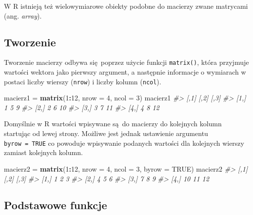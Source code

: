 \documentclass[paper=6in:9in,pagesize=pdftex,headinclude=on,footinclude=on,10pt]{scrbook}
\newenvironment{Shaded}{\begin{snugshade}}{\end{snugshade}}
\newcommand{\CommentTok}[1]{\textcolor[rgb]{0.56,0.35,0.01}{\textit{#1}}}
\newcommand{\DataTypeTok}[1]{\textcolor[rgb]{0.13,0.29,0.53}{#1}}
\newcommand{\DecValTok}[1]{\textcolor[rgb]{0.00,0.00,0.81}{#1}}
\newcommand{\KeywordTok}[1]{\textcolor[rgb]{0.13,0.29,0.53}{\textbf{#1}}}
\newcommand{\NormalTok}[1]{#1}
\newcommand{\OperatorTok}[1]{\textcolor[rgb]{0.81,0.36,0.00}{\textbf{#1}}}
\newcommand{\OtherTok}[1]{\textcolor[rgb]{0.56,0.35,0.01}{#1}}
\newcommand{\StringTok}[1]{\textcolor[rgb]{0.31,0.60,0.02}{#1}}
\let\BeginKnitrBlock\begin \let\EndKnitrBlock\end
\begin{document}
\BeginKnitrBlock{rmdinfo}
W R istnieją też wielowymiarowe obiekty podobne do macierzy zwane matrycami (ang. \emph{array}).
\EndKnitrBlock{rmdinfo}

\hypertarget{tworzenie}{%
\subsection{Tworzenie}\label{tworzenie}}

Tworzenie macierzy odbywa się~poprzez użycie funkcji \texttt{matrix()}, która przyjmuje wartości wektora jako pierwszy argument, a następnie informacje o wymiarach w postaci liczby wierszy (\texttt{nrow}) i liczby kolumn (\texttt{ncol}).

\begin{Shaded}
\begin{Highlighting}[]
\NormalTok{macierz1 =}\StringTok{ }\KeywordTok{matrix}\NormalTok{(}\DecValTok{1}\OperatorTok{:}\DecValTok{12}\NormalTok{, }\DataTypeTok{nrow =} \DecValTok{4}\NormalTok{, }\DataTypeTok{ncol =} \DecValTok{3}\NormalTok{)}
\NormalTok{macierz1}
\CommentTok{#>      [,1] [,2] [,3]}
\CommentTok{#> [1,]    1    5    9}
\CommentTok{#> [2,]    2    6   10}
\CommentTok{#> [3,]    3    7   11}
\CommentTok{#> [4,]    4    8   12}
\end{Highlighting}
\end{Shaded}

Domyślnie w R wartości wpisywane są~do macierzy do kolejnych kolumn startując od lewej strony.
Możliwe jest jednak ustawienie argumentu \texttt{byrow\ =\ TRUE} co powoduje wpisywanie podanych wartości dla kolejnych wierszy zamiast kolejnych kolumn.

\begin{Shaded}
\begin{Highlighting}[]
\NormalTok{macierz2 =}\StringTok{ }\KeywordTok{matrix}\NormalTok{(}\DecValTok{1}\OperatorTok{:}\DecValTok{12}\NormalTok{, }\DataTypeTok{nrow =} \DecValTok{4}\NormalTok{, }\DataTypeTok{ncol =} \DecValTok{3}\NormalTok{, }\DataTypeTok{byrow =} \OtherTok{TRUE}\NormalTok{)}
\NormalTok{macierz2}
\CommentTok{#>      [,1] [,2] [,3]}
\CommentTok{#> [1,]    1    2    3}
\CommentTok{#> [2,]    4    5    6}
\CommentTok{#> [3,]    7    8    9}
\CommentTok{#> [4,]   10   11   12}
\end{Highlighting}
\end{Shaded}

\hypertarget{podstawowe-funkcje}{%
\subsection{Podstawowe funkcje}\label{podstawowe-funkcje}}
\end{document}
